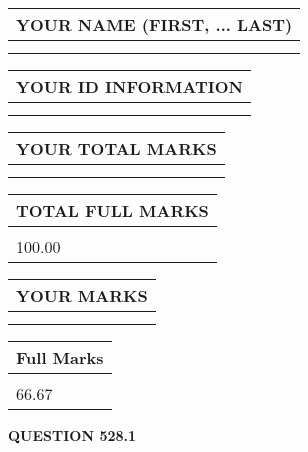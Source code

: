 \documentclass{ctexart}
\begin{document}
   
   
   
\newpage 
\setcounter{page}{ 
   528001 } 
   
   
   
   
\noindent\begin{tabular}{|l|}
\hline
YOUR NAME (FIRST, ... LAST)  \\
\hline
 \\ 
 \\ 
\hline
\end{tabular}
\hspace{0.05in} \begin{tabular}{|l|}
\hline
 YOUR   ID   INFORMATION  \\
\hline
 \\ 
 \\ 
\hline
\end{tabular}
   
   
\vspace{0.2in}\noindent\begin{tabular}{|l|}
\hline
YOUR TOTAL MARKS  \\
\hline
 \\ 
 \\ 
\hline
\end{tabular}
\hspace{0.05in} \begin{tabular}{|l|}
\hline
TOTAL FULL MARKS  \\
\hline
 \\ 
100.00 \\
\hline
\end{tabular}
   
   
 \vspace{0.2in}
 
 
 
 
   
   
  
\vspace{0.2in}
  
\noindent\begin{tabular}{|l|}
\hline
 YOUR MARKS  \\
\hline
 \\ 
 \\ 
\hline
\end{tabular}
\hspace{0.05in} \begin{tabular}{|l|}
\hline
 Full Marks  \\
\hline
 \\ 
66.67 \\
\hline
\end{tabular}
{\textbf{\Large{QUESTION
528.1 
}}}
  
\end{document}

